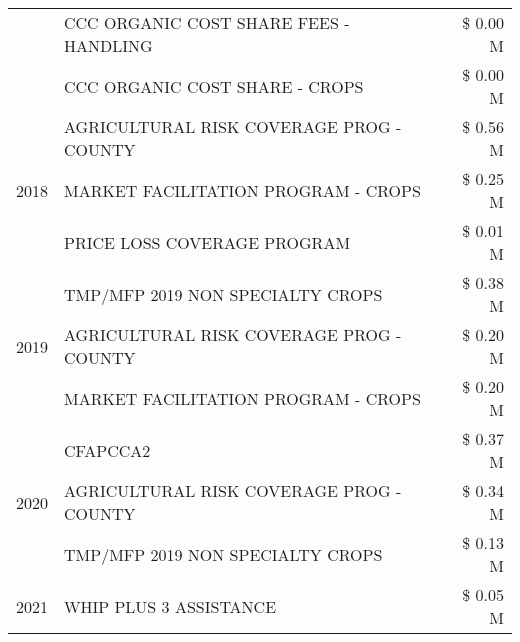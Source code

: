 \begin{tabular}{llr}
 & CCC ORGANIC COST SHARE FEES - HANDLING & \$ 0.00 M \\
 & CCC ORGANIC COST SHARE - CROPS & \$ 0.00 M \\
\cline{1-3}
\multirow[t]{3}{*}{2018} & AGRICULTURAL RISK COVERAGE PROG - COUNTY & \$ 0.56 M \\
 & MARKET FACILITATION PROGRAM - CROPS & \$ 0.25 M \\
 & PRICE LOSS COVERAGE PROGRAM & \$ 0.01 M \\
\cline{1-3}
\multirow[t]{3}{*}{2019} & TMP/MFP 2019 NON SPECIALTY CROPS & \$ 0.38 M \\
 & AGRICULTURAL RISK COVERAGE PROG - COUNTY & \$ 0.20 M \\
 & MARKET FACILITATION PROGRAM - CROPS & \$ 0.20 M \\
\cline{1-3}
\multirow[t]{3}{*}{2020} & CFAPCCA2 & \$ 0.37 M \\
 & AGRICULTURAL RISK COVERAGE PROG - COUNTY & \$ 0.34 M \\
 & TMP/MFP 2019 NON SPECIALTY CROPS & \$ 0.13 M \\
\cline{1-3}
2021 & WHIP PLUS 3 ASSISTANCE & \$ 0.05 M \\
\cline{1-3}
\bottomrule
\end{tabular}
